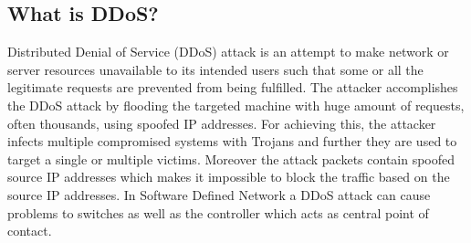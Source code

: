 \documentclass[12pt,a4paper,final]{report}
\begin{document}
\subsection{What is DDoS?}
Distributed Denial of Service\cite{BasePaper6} (DDoS) attack is an attempt to make network or server resources unavailable to its intended users such that some or all the legitimate requests are prevented from being fulfilled. The attacker accomplishes the DDoS attack by flooding the targeted machine with huge amount of requests, often thousands, using spoofed IP addresses. For achieving this, the attacker infects multiple compromised systems with Trojans and further they are used to target a single or multiple victims. Moreover the attack packets contain spoofed source IP addresses which makes it impossible to block the traffic based on the source IP addresses. In Software Defined Network a DDoS attack can cause problems to switches as well as the controller which acts as central point of contact.
\end{document}
